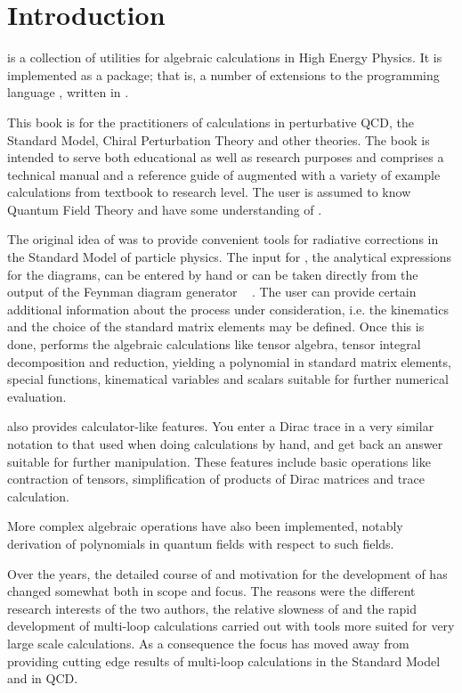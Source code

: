 \section{Introduction}
\label{intro}

\fc is a collection of utilities for algebraic calculations in 
High Energy Physics. It is implemented as a \mma package; that is,
a number of extensions to the programming language \mma,
written in \mma. 

This book is for the practitioners of calculations in perturbative QCD,
the Standard Model, Chiral Perturbation Theory and other theories.
The book is intended to serve both educational as well as research purposes
and comprises a technical manual and a reference guide of \fc
augmented with a variety of example calculations from textbook to research level.
The user is assumed to know Quantum Field Theory and have some understanding of \mma.

The original idea of \fc was to provide convenient tools 
for radiative corrections in the Standard Model of particle physics. 
The input for \fc, the analytical expressions for the diagrams, can be 
entered by hand or can be taken directly from the output of the Feynman diagram generator \fa\ \cite{feynarts} .
The user can provide certain additional  information about the process 
under consideration, i.e. the kinematics and the choice of the standard 
matrix elements may be defined. Once this is done, \fc performs the 
algebraic calculations like tensor algebra, tensor integral decomposition and reduction,
yielding a polynomial in standard matrix elements,  special functions, kinematical 
variables and scalars suitable for further numerical evaluation.

\fc also provides calculator-like features. You enter a Dirac trace 
in a very similar notation to that used when doing calculations by hand, and 
get back an answer suitable 
for further manipulation. These features include basic operations like contraction of
tensors, simplification of products of Dirac matrices and trace calculation.

More complex algebraic operations have also been implemented, notably derivation
of polynomials in quantum fields with respect to such fields.

Over the years, the detailed course of and motivation for the development of \fc has
changed somewhat both in scope and focus. The reasons were  the different research
interests of the two authors, the relative slowness of \mma and the rapid development of
multi-loop calculations carried out with tools \cite{form, formcalc} more suited 
for very large scale calculations.
As a consequence the focus has moved away from providing cutting edge results of multi-loop calculations
in the Standard Model and in QCD. 

